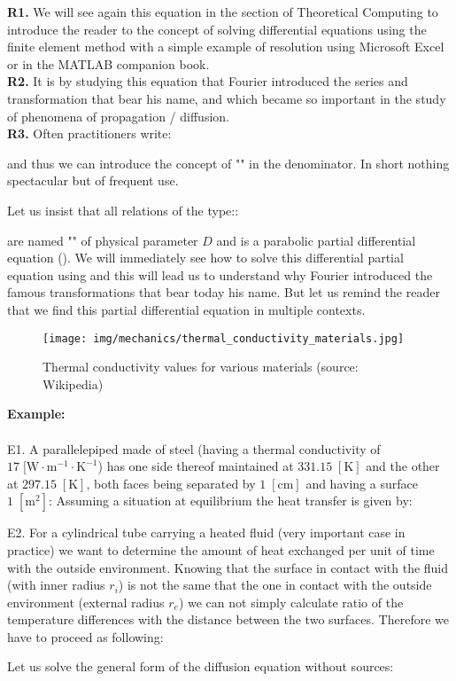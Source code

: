 	\begin{tcolorbox}[title=Remark,colframe=black,arc=10pt]
	\textbf{R1.} We will see again this equation in the section of Theoretical Computing to introduce the reader to the concept of solving differential equations using the finite element method with a simple example of resolution using Microsoft Excel or in the MATLAB companion book.\\

	\textbf{R2.} It is by studying this equation that Fourier introduced the series and transformation that bear his name, and which became so important in the study of phenomena of propagation / diffusion.\\

	\textbf{R3.} Often practitioners write:
	
	and thus we can introduce the concept of "" in the denominator. In short nothing spectacular but of frequent use.
	\end{tcolorbox}
	Let us insist that all relations of the type::
	
	are named "" of physical parameter $D$ and is a parabolic partial differential equation (). We will immediately see how to solve this differential partial equation using and this will lead us to understand why Fourier introduced the famous transformations that bear today his name. But let us remind the reader that we find this partial differential equation in multiple contexts.	
	\begin{figure}[H]
		\centering
		\texttt{[image: img/mechanics/thermal\_conductivity\_materials.jpg]}
		\caption{Thermal conductivity values for various materials (source: Wikipedia)}
	\end{figure}
	
	\begin{tcolorbox}[colframe=black,colback=white,sharp corners]
	\textbf{{\Large {}}Example:}\\\\
	E1. A parallelepiped made of steel (having a thermal conductivity of $17\;[\text{W}\cdot \text{m}^{-1}\cdot \text{K}^{-1}$) has one side thereof maintained at $331.15\; [\text{K}]$ and the other at $297.15\; [\text{K}]$, both faces being separated by $1\; [\text{cm}]$ and having a surface $1\; [\text{m}^2]$:
	Assuming a situation at equilibrium the heat transfer is given by:
	
	
	E2. For a cylindrical tube carrying a heated fluid (very important case in practice) we want to determine the amount of heat exchanged per unit of time with the outside environment. Knowing that the surface in contact with the fluid (with inner radius $r_i$) is not the same that the one in contact with the outside environment (external radius $r_e$) we can not simply calculate ratio of the temperature differences with the distance between the two surfaces. Therefore we have to proceed as following:
	
	\end{tcolorbox}
	Let us solve the general form of the diffusion equation without sources:
	
